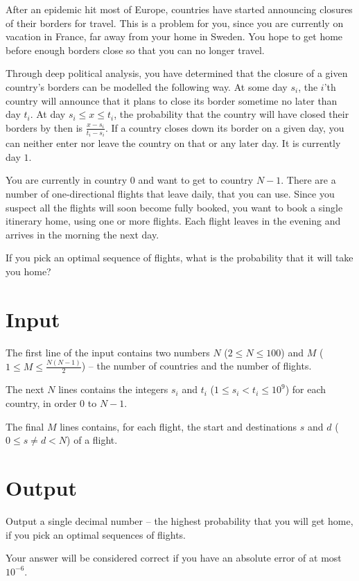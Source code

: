 After an epidemic hit most of Europe, countries have started announcing closures of their borders for travel.
This is a problem for you, since you are currently on vacation in France, far away from your home in Sweden.
You hope to get home before enough borders close so that you can no longer travel.

Through deep political analysis, you have determined that the closure of a given country's borders can be modelled the following way.
At some day $s_i$, the $i$'th country will announce that it plans to close its border sometime no later than day $t_i$.
At day $s_i \le x \le t_i$, the probability that the country will have closed their borders by then is $\frac{x - s_i}{t_i - s_i}$.
If a country closes down its border on a given day, you can neither enter nor leave the country on that or any later day.
It is currently day $1$.

You are currently in country $0$ and want to get to country $N - 1$.
There are a number of one-directional flights that leave daily, that you can use.
Since you suspect all the flights will soon become fully booked, you want to book a single itinerary home, using one or more flights.
Each flight leaves in the evening and arrives in the morning the next day.

If you pick an optimal sequence of flights, what is the probability that it will take you home?

\section*{Input}
The first line of the input contains two numbers $N$ ($2 \le N \le 100$) and $M$ ($1 \le M \le \frac{N(N-1)}{2}$)  -- the number of countries and the number of flights.

The next $N$ lines contains the integers $s_i$ and $t_i$ ($1 \le s_i < t_i \le 10^9$) for each country, in order $0$ to $N - 1$.

The final $M$ lines contains, for each flight, the start and destinations $s$ and $d$ ($0 \le s \neq d < N$) of a flight.

\section{Output}
Output a single decimal number -- the highest probability that you will get home, if you pick an optimal sequences of flights.

Your answer will be considered correct if you have an absolute error of at most ${10}^{-6}$.
